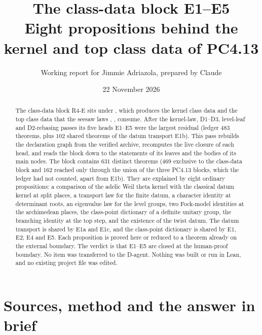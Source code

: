 \documentclass[11pt]{article}
\title{The class-data block E1--E5\\ Eight propositions behind the kernel and top class data of PC4.13}
\author{Working report for Jimmie Adriazola, prepared by Claude}
\date{22 November 2026}
\theoremstyle{remark}
\begin{document}
\maketitle

\begin{abstract}
The class-data block R4-E sits under , which produces the kernel class data and the top class data that the seesaw laws , ,  consume. After the kernel-law, D1--D3, level-leaf and D2-rebasing passes its five heads E1--E5 were the largest residual (ledger $483$ theorems, plus $102$ shared theorems of the datum transport E1b). This pass rebuilds the declaration graph from the verified archive, recomputes the live closure of each head, and reads the block down to the statements of its leaves and the bodies of its main nodes. The block contains $631$ distinct theorems ($469$ exclusive to the class-data block and $162$ reached only through the union of the three PC4.13 blocks, which the ledger had not counted, apart from E1b). They are explained by eight ordinary propositions: a comparison of the adelic Weil theta kernel with the classical datum kernel at split places, a transport law for the finite datum, a character identity at determinant roots, an eigenvalue law for the level groups, two Fock-model identities at the archimedean places, the class-point dictionary of a definite unitary group, the branching identity at the top step, and the existence of the twist datum. The datum transport is shared by E1a and E1c, and the class-point dictionary is shared by E1, E2, E4 and E5. Each proposition is proved here or reduced to a theorem already on the external boundary. The verdict is that E1--E5 are closed at the human-proof boundary. No item was transferred to the D-agent. Nothing was built or run in Lean, and no existing project file was edited.
\end{abstract}

\tableofcontents

\section{Sources, method and the answer in brief}
\end{document}
